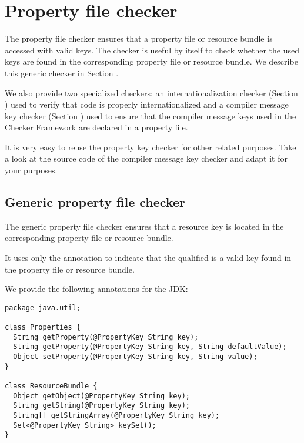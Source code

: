 \htmlhr
\chapter{Property file checker\label{propkey-checker}}

The property file checker ensures that a property file or resource bundle is
accessed with valid keys.
The checker is useful by itself to check whether the used keys are found in the
corresponding property file or resource bundle. We describe this generic checker
in Section .

We also provide two specialized checkers:
an internationalization checker (Section ) used to
verify that code is properly internationalized and
a compiler message key checker (Section ) used
to ensure that the compiler message keys used in the Checker Framework are
declared in a property file.

It is very easy to reuse the property key checker for other related purposes.
Take a look at the source code of the compiler message key checker and adapt it for
your purposes.



\section{Generic property file checker\label{genpropkey-checker}}

The generic property file checker ensures that a resource key is located
in the corresponding property file or resource bundle.


It uses only the annotation 
to indicate that the qualified  is a valid key
found in the property file or resource bundle.

We provide the following annotations for the JDK:

\begin{Verbatim}
package java.util;

class Properties {
  String getProperty(@PropertyKey String key);
  String getProperty(@PropertyKey String key, String defaultValue);
  Object setProperty(@PropertyKey String key, String value); 
}

class ResourceBundle {
  Object getObject(@PropertyKey String key);
  String getString(@PropertyKey String key);
  String[] getStringArray(@PropertyKey String key);
  Set<@PropertyKey String> keySet();
}
\end{Verbatim}



